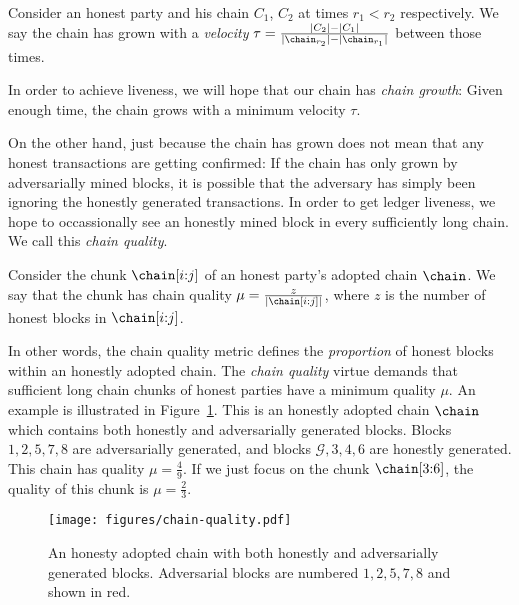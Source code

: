 \begin{definition}
  Consider an honest party and his chain $C_1$, $C_2$ at times $r_1 < r_2$ respectively.
  We say the chain has grown with a \emph{velocity}
  $\tau = \frac{|C_2| - |C_1|}{|\chain_{r_2}| - |\chain_{r_1}|}$
  between those times.
\end{definition}

In order to achieve liveness, we will hope that our chain has \emph{chain growth}:
Given enough time, the chain grows with a minimum velocity $\tau$.

On the other hand, just because the chain has grown does not mean that any honest
transactions are getting confirmed: If the chain has only grown by adversarially mined
blocks, it is possible that the adversary has simply been ignoring the honestly generated
transactions. In order to get ledger liveness, we hope to occassionally see an honestly
mined block in every sufficiently long chain. We call this \emph{chain quality}.

\begin{definition}
  Consider the chunk $\chain[i{:}j]$ of an honest party's adopted chain $\chain$.
  We say that the chunk has chain quality $\mu = \frac{z}{|\chain[i{:}j]|}$, where
  $z$ is the number of honest blocks in $\chain[i{:}j]$.
\end{definition}

In other words, the chain quality metric defines the \emph{proportion} of honest blocks
within an honestly adopted chain. The \emph{chain quality} virtue demands that
sufficient long chain chunks of honest parties have a minimum quality $\mu$. An example
is illustrated in Figure~\ref{fig.chain-quality}. This is an honestly adopted chain $\chain$
which contains both honestly and adversarially generated blocks. Blocks $1, 2, 5, 7, 8$
are adversarially generated, and blocks $\mathcal{G}, 3, 4, 6$ are honestly generated.
This chain has quality $\mu = \frac{4}{9}$. If we just focus on the chunk $\chain[3{:}6]$,
the quality of this chunk is $\mu = \frac{2}{3}$.

\begin{figure}[h]
    \centering
    \texttt{[image: figures/chain-quality.pdf]}
    \caption{An honesty adopted chain with both honestly and adversarially generated blocks.
             Adversarial blocks are numbered $1, 2, 5, 7, 8$ and shown in red.}
    \label{fig.chain-quality}
\end{figure}

